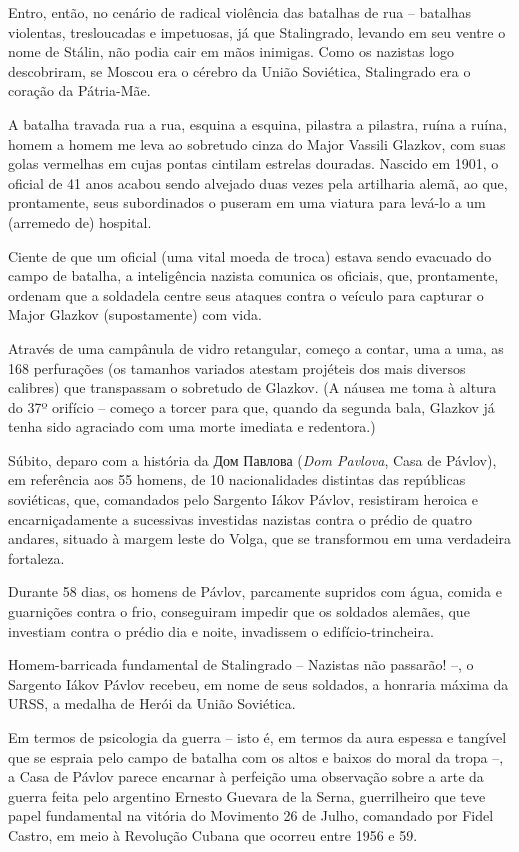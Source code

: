 Entro, então, no cenário de radical violência das batalhas de rua --
batalhas violentas, tresloucadas e impetuosas, já que Stalingrado,
levando em seu ventre o nome de Stálin, não podia cair em mãos inimigas.
Como os nazistas logo descobriram, se Moscou era o cérebro da União
Soviética, Stalingrado era o coração da Pátria-Mãe.

A batalha travada rua a rua, esquina a esquina, pilastra a pilastra,
ruína a ruína, homem a homem me leva ao sobretudo cinza do Major Vassili
Glazkov, com suas golas vermelhas em cujas pontas cintilam estrelas
douradas. Nascido em 1901, o oficial de 41 anos acabou sendo alvejado
duas vezes pela artilharia alemã, ao que, prontamente, seus subordinados
o puseram em uma viatura para levá-lo a um (arremedo de) hospital.

Ciente de que um oficial (uma vital moeda de troca) estava sendo
evacuado do campo de batalha, a inteligência nazista comunica os
oficiais, que, prontamente, ordenam que a soldadela centre seus ataques
contra o veículo para capturar o Major Glazkov (supostamente) com vida.

Através de uma campânula de vidro retangular, começo a contar, uma a
uma, as 168 perfurações (os tamanhos variados atestam projéteis dos mais
diversos calibres) que transpassam o sobretudo de Glazkov. (A náusea me
toma à altura do 37º orifício -- começo a torcer para que, quando da
segunda bala, Glazkov já tenha sido agraciado com uma morte imediata e
redentora.)

Súbito, deparo com a história da Дом Павлова 
(\emph{Dom Pavlova}, Casa de Pávlov), em referência aos 55
homens, de 10 nacionalidades distintas das repúblicas soviéticas, que,
comandados pelo Sargento Iákov Pávlov, resistiram heroica e
encarniçadamente a sucessivas investidas nazistas contra o prédio de
quatro andares, situado à margem leste do Volga, que se transformou em
uma verdadeira fortaleza.

Durante 58 dias, os homens de Pávlov, parcamente supridos com água,
comida e guarnições contra o frio, conseguiram impedir que os soldados
alemães, que investiam contra o prédio dia e noite, invadissem o
edifício-trincheira.

Homem-barricada fundamental de Stalingrado -- Nazistas não passarão! --,
o Sargento Iákov Pávlov recebeu, em nome de seus soldados, a honraria
máxima da URSS, a medalha de Herói da União Soviética.

Em termos de psicologia da guerra -- isto é, em termos da aura espessa e
tangível que se espraia pelo campo de batalha com os altos e baixos do
moral da tropa --, a Casa de Pávlov parece encarnar à perfeição uma
observação sobre a arte da guerra feita pelo argentino Ernesto Guevara
de la Serna, guerrilheiro que teve papel fundamental na vitória do
Movimento 26 de Julho, comandado por Fidel Castro, em meio à Revolução
Cubana que ocorreu entre 1956 e 59.

